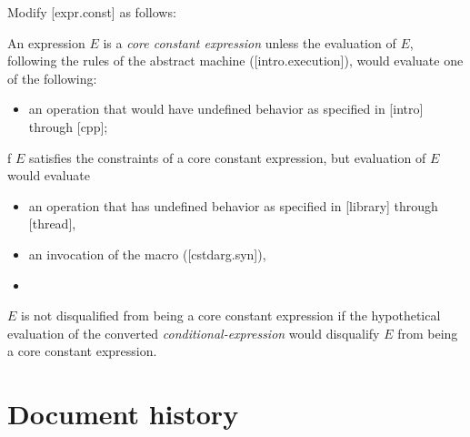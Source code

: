 \pagebreak

Modify [expr.const] as follows:

\begin{adjustwidth}{0.5cm}{0.5cm}

An expression $E$ is a \emph{core constant expression} unless the evaluation of $E$, following the rules of the abstract machine ([intro.execution]), would evaluate one of the following:
\begin{itemize}
\item an operation that would have undefined behavior as specified in [intro] through [cpp];
\end{itemize}

f $E$ satisfies the constraints of a core constant expression, but evaluation of $E$ would evaluate

\begin{itemize}
\item an operation that has undefined behavior as specified in [library] through [thread],
\item an invocation of the  macro ([cstdarg.syn]),
\item {}
\end{itemize}

\begin{addedblock}
\begin{note}
$E$ is not disqualified from being a core constant expression if the hypothetical evaluation of the converted \emph{conditional-expression} would disqualify $E$ from being a core constant expression.
\end{note}
\end{addedblock}


\end{adjustwidth}

\section*{Document history}

